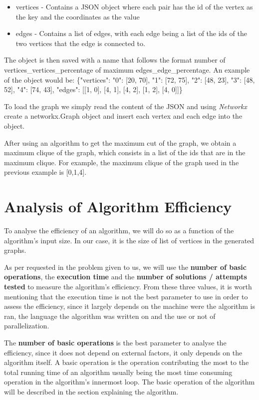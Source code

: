 \documentclass[]{revdetua}
\begin{document}
\begin{itemize}
    \item vertices - Contains a JSON object where each pair has the id of the vertex as the key and the coordinates as the value
    \item edges - Contains a list of edges, with each edge being a list of the ids of the two vertices that the edge is connected to.
\end{itemize}

The object is then saved with a name that follows the format {number of vertices}\_vertices\_{percentage of maximum edges}\_edge\_percentage. An example of the object would be:
\linebreak \linebreak
 \{"vertices": {"0": [20, 70], "1": [72, 75], "2": [48, 23], "3": [48, 52], "4": [74, 43]}, "edges": [[1, 0], [4, 1], [4, 2], [1, 2], [4, 0]]\}
\linebreak

To load the graph we simply read the content of the JSON and using \textit{Networkx} create a networkx.Graph object and insert each vertex and each edge into the object.

After using an algorithm to get the maximum cut of the graph, we obtain a maximum clique of the graph, which consists in a list of the ids that are in the maximum clique. For example, the maximum clique of the graph used in the previous example is [0,1,4].

\section{Analysis of Algorithm Efficiency}

To analyse the efficiency of an algorithm, we will do so as a function of the algorithm's input size. In our case, it is the size of list of vertices in the generated graphs.

As per requested in the problem given to us, we will use the \textbf{number of basic operations}, the \textbf{execution time} and the \textbf{number of solutions / attempts tested} to measure the algorithm's efficiency. From these three values, it is worth mentioning that the execution time is not the best parameter to use in order to assess the efficiency, since it largely depends on the machine were the algorithm is ran, the language the algorithm was written on and the use or not of parallelization.

The \textbf{number of basic operations} is the best parameter to analyse the efficiency, since it does not depend on external factors, it only depends on the algorithm itself. A basic operation is the operation contributing the most to the total running time of an algorithm usually being the most time consuming operation in the algorithm's innermost loop. The basic operation of the algorithm will be described in the section explaining the algorithm.
\end{document}
